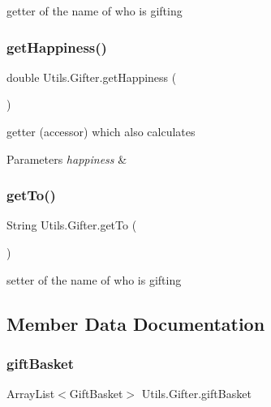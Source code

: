 getter of the name of who is gifting \mbox{\label{class_utils_1_1_gifter_a225a7aad5c80f5ed994433019deb2ec8}} 
\subsubsection{\texorpdfstring{get\+Happiness()}{getHappiness()}}
{\footnotesize\ttfamily double Utils.\+Gifter.\+get\+Happiness (\begin{DoxyParamCaption}{ }\end{DoxyParamCaption})\hspace{0.3cm}{\ttfamily [inline]}}

getter (accessor) which also calculates 
\begin{DoxyParams}{Parameters}
{\em happiness} & \\
\hline
\end{DoxyParams}
\mbox{\label{class_utils_1_1_gifter_a87a74e04ad51fa6b4daaeb95a3cacdf1}} 
\subsubsection{\texorpdfstring{get\+To()}{getTo()}}
{\footnotesize\ttfamily String Utils.\+Gifter.\+get\+To (\begin{DoxyParamCaption}{ }\end{DoxyParamCaption})\hspace{0.3cm}{\ttfamily [inline]}}

setter of the name of who is gifting 

\subsection{Member Data Documentation}
\mbox{\label{class_utils_1_1_gifter_a84e80a45026df5d08aefda2591823504}} 
\subsubsection{\texorpdfstring{gift\+Basket}{giftBasket}}
{\footnotesize\ttfamily Array\+List$<$Gift\+Basket$>$ Utils.\+Gifter.\+gift\+Basket}

